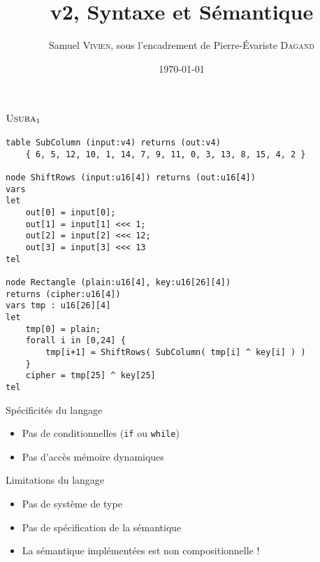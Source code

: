 \documentclass{beamer}
\author{Samuel \textsc{Vivien}, sous l'encadrement de Pierre-Évariste \textsc{Dagand}}
\title{\Usuba{} v2, Syntaxe et Sémantique}
\date{\today}
\newcommand{\UsubaA}{$\textsc{Usuba}_1$}
\begin{document}
\begin{frame}
    \titlepage
\end{frame}

\begin{frame}{}
    \tableofcontents
\end{frame}

\section{\UsubaA{}}

\begin{frame}[fragile]
\scriptsize
\begin{lstlisting}
table SubColumn (input:v4) returns (out:v4)
    { 6, 5, 12, 10, 1, 14, 7, 9, 11, 0, 3, 13, 8, 15, 4, 2 }

node ShiftRows (input:u16[4]) returns (out:u16[4])
vars
let
    out[0] = input[0];
    out[1] = input[1] <<< 1;
    out[2] = input[2] <<< 12;
    out[3] = input[3] <<< 13
tel

node Rectangle (plain:u16[4], key:u16[26][4])
returns (cipher:u16[4])
vars tmp : u16[26][4]
let
    tmp[0] = plain;
    forall i in [0,24] {
        tmp[i+1] = ShiftRows( SubColumn( tmp[i] ^ key[i] ) )
    }
    cipher = tmp[25] ^ key[25]
tel
\end{lstlisting}
\end{frame}

\begin{frame}{Spécificités du langage}
\begin{itemize}
\item<1-> Pas de conditionnelles (\texttt{if} ou \texttt{while})
\item<1-> Pas d'accès mémoire dynamiques
\end{itemize}

\end{frame}

\begin{frame}{Limitations du langage}
\begin{itemize}
\item Pas de système de type
\item Pas de spécification de la sémantique
\item La sémantique implémentées est non compositionnelle !
\end{itemize}

\medskip


\end{frame}
\end{document}
